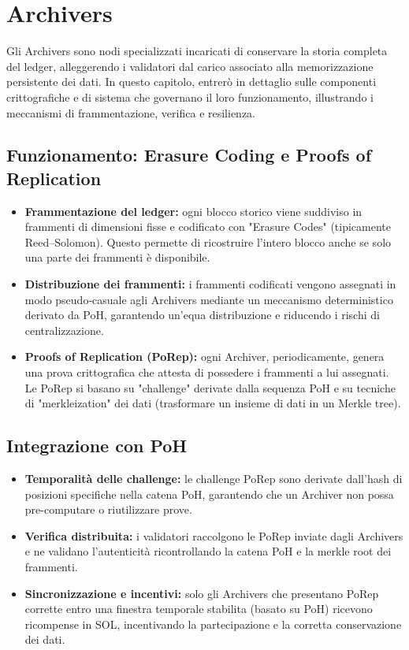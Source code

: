 \documentclass[a4paper,12pt]{report}
\begin{document}
	\section{Archivers}
	
	Gli Archivers sono nodi specializzati incaricati di conservare la storia completa del ledger, alleggerendo i validatori dal carico associato alla memorizzazione persistente dei dati. In questo capitolo, entrerò in dettaglio sulle componenti crittografiche e di sistema che governano il loro funzionamento, illustrando i meccanismi di frammentazione, verifica e resilienza.
	
	\subsection{Funzionamento: Erasure Coding e Proofs of Replication}
	\begin{itemize}
		\item \textbf{Frammentazione del ledger:} ogni blocco storico viene suddiviso in frammenti di dimensioni fisse e codificato con "Erasure Codes" (tipicamente Reed–Solomon). Questo permette di ricostruire l’intero blocco anche se solo una parte dei frammenti è disponibile.
		\item \textbf{Distribuzione dei frammenti:} i frammenti codificati vengono assegnati in modo pseudo‑casuale agli Archivers mediante un meccanismo deterministico derivato da PoH, garantendo un’equa distribuzione e riducendo i rischi di centralizzazione.
		\item \textbf{Proofs of Replication (PoRep):} ogni Archiver, periodicamente, genera una prova crittografica che attesta di possedere i frammenti a lui assegnati. Le PoRep si basano su "challenge" derivate dalla sequenza PoH e su tecniche di "merkleization" dei dati (trasformare un insieme di dati in un Merkle tree).
	\end{itemize}
	
	\subsection{Integrazione con PoH}
	\begin{itemize}
		\item \textbf{Temporalità delle challenge:} le challenge PoRep sono derivate dall’hash di posizioni specifiche nella catena PoH, garantendo che un Archiver non possa pre-computare o riutilizzare prove.
		\item \textbf{Verifica distribuita:} i validatori raccolgono le PoRep inviate dagli Archivers e ne validano l’autenticità ricontrollando la catena PoH e la merkle root dei frammenti.
		\item \textbf{Sincronizzazione e incentivi:} solo gli Archivers che presentano PoRep corrette entro una finestra temporale stabilita (basato su PoH) ricevono ricompense in SOL, incentivando la partecipazione e la corretta conservazione dei dati.
	\end{itemize}
	
\end{document}
